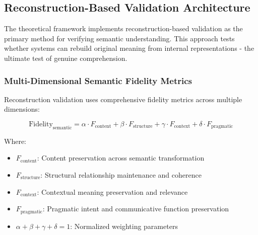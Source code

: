 \documentclass[12pt,a4paper,twoside]{article}
\begin{document}
\subsection{Reconstruction-Based Validation Architecture}

The theoretical framework implements reconstruction-based validation as the primary method for verifying semantic understanding. This approach tests whether systems can rebuild original meaning from internal representations - the ultimate test of genuine comprehension.

\subsubsection{Multi-Dimensional Semantic Fidelity Metrics}

Reconstruction validation uses comprehensive fidelity metrics across multiple dimensions:

\begin{equation}
\text{Fidelity}_{\text{semantic}} = \alpha \cdot F_{\text{content}} + \beta \cdot F_{\text{structure}} + \gamma \cdot F_{\text{context}} + \delta \cdot F_{\text{pragmatic}}
\end{equation}

Where:
\begin{itemize}
\item $F_{\text{content}}$: Content preservation across semantic transformation
\item $F_{\text{structure}}$: Structural relationship maintenance and coherence
\item $F_{\text{context}}$: Contextual meaning preservation and relevance
\item $F_{\text{pragmatic}}$: Pragmatic intent and communicative function preservation
\item $\alpha + \beta + \gamma + \delta = 1$: Normalized weighting parameters
\end{itemize}
\end{document}
